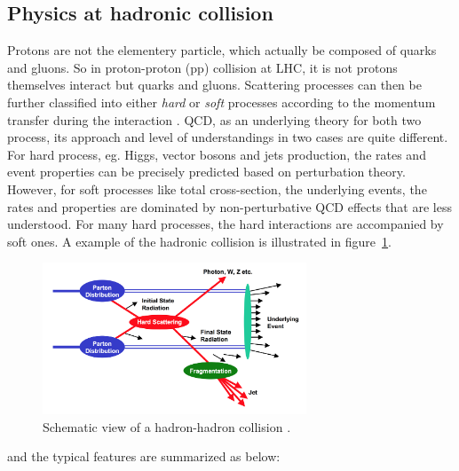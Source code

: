 \subsection{Physics at hadronic collision}
\label{hadroniccollision}

Protons are not the elementery particle, which actually be composed of quarks and gluons.
So in proton-proton (pp) collision at LHC, it is not protons themselves interact but quarks and gluons.
Scattering processes can then be further classified into either \textit{hard} or \textit{soft} processes
according to the momentum transfer during the interaction \cite{Dremin:2005wd}.
QCD, as an underlying theory for both two process, its approach and level of understandings in two cases are quite different.
For hard process, eg. Higgs, vector bosons and jets production, the rates and event
properties can be precisely predicted based on perturbation theory.
However, for soft processes like total cross-section, the underlying events, the rates and properties are dominated by non-perturbative QCD effects
that are less understood.
For many hard processes, the hard interactions are accompanied by soft ones.
A example of the hadronic collision is illustrated in figure~\ref{fig:C2_had_col}. 
\begin{figure}[!htb]
  \centering
  \includegraphics[width=0.7\textwidth]{figures/Theory/hh_collision.png}
  \caption{Schematic view of a hadron-hadron collision \cite{Womersley:2000cx}.}
  \label{fig:C2_had_col}
\end{figure}
and the typical features are summarized as below:
